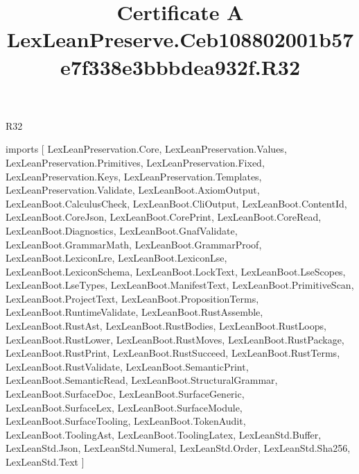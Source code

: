 \begin{lexlean}{R32}
\title{Certificate A LexLeanPreserve.Ceb108802001b57e7f338e3bbbdea932f.R32}
\begin{coremodule}
imports [
  LexLeanPreservation.Core,
  LexLeanPreservation.Values,
  LexLeanPreservation.Primitives,
  LexLeanPreservation.Fixed,
  LexLeanPreservation.Keys,
  LexLeanPreservation.Templates,
  LexLeanPreservation.Validate,
  LexLeanBoot.AxiomOutput,
  LexLeanBoot.CalculusCheck,
  LexLeanBoot.CliOutput,
  LexLeanBoot.ContentId,
  LexLeanBoot.CoreJson,
  LexLeanBoot.CorePrint,
  LexLeanBoot.CoreRead,
  LexLeanBoot.Diagnostics,
  LexLeanBoot.GnafValidate,
  LexLeanBoot.GrammarMath,
  LexLeanBoot.GrammarProof,
  LexLeanBoot.LexiconLre,
  LexLeanBoot.LexiconLse,
  LexLeanBoot.LexiconSchema,
  LexLeanBoot.LockText,
  LexLeanBoot.LseScopes,
  LexLeanBoot.LseTypes,
  LexLeanBoot.ManifestText,
  LexLeanBoot.PrimitiveScan,
  LexLeanBoot.ProjectText,
  LexLeanBoot.PropositionTerms,
  LexLeanBoot.RuntimeValidate,
  LexLeanBoot.RustAssemble,
  LexLeanBoot.RustAst,
  LexLeanBoot.RustBodies,
  LexLeanBoot.RustLoops,
  LexLeanBoot.RustLower,
  LexLeanBoot.RustMoves,
  LexLeanBoot.RustPackage,
  LexLeanBoot.RustPrint,
  LexLeanBoot.RustSucceed,
  LexLeanBoot.RustTerms,
  LexLeanBoot.RustValidate,
  LexLeanBoot.SemanticPrint,
  LexLeanBoot.SemanticRead,
  LexLeanBoot.StructuralGrammar,
  LexLeanBoot.SurfaceDoc,
  LexLeanBoot.SurfaceGeneric,
  LexLeanBoot.SurfaceLex,
  LexLeanBoot.SurfaceModule,
  LexLeanBoot.SurfaceTooling,
  LexLeanBoot.TokenAudit,
  LexLeanBoot.ToolingAst,
  LexLeanBoot.ToolingLatex,
  LexLeanStd.Buffer,
  LexLeanStd.Json,
  LexLeanStd.Numeral,
  LexLeanStd.Order,
  LexLeanStd.Sha256,
  LexLeanStd.Text
]


\end{coremodule}
\end{lexlean}
